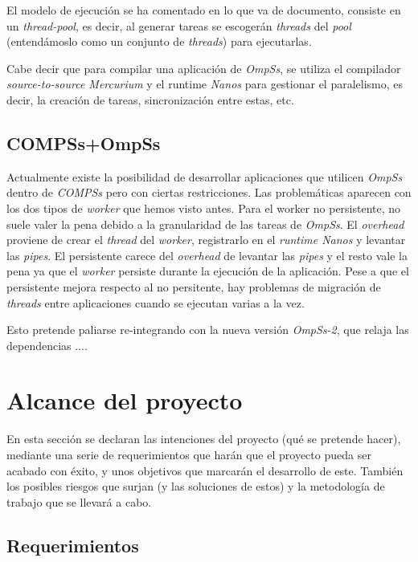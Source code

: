 \documentclass[a4paper]{article}
\begin{document}
El modelo de ejecución se ha comentado en lo que va de documento, consiste en un \textit{thread-pool}, es decir, al generar tareas se escogerán \textit{threads} del \textit{pool} (entendámoslo como un conjunto de \textit{threads}) para ejecutarlas.
\par\bigskip

Cabe decir que para compilar una aplicación de \textit{OmpSs}, se utiliza el compilador \textit{source-to-source Mercurium} y el runtime \textit{Nanos} para gestionar el paralelismo, es decir, la creación de tareas, sincronización entre estas, etc.

\subsection{COMPSs+OmpSs} \label{compssompss}

Actualmente existe la posibilidad de desarrollar aplicaciones que utilicen \textit{OmpSs} dentro de \textit{COMPSs} pero con ciertas restricciones. Las problemáticas aparecen con los dos tipos de \textit{worker} que hemos visto antes. Para el worker no persistente, no suele valer la pena debido a la granularidad de las tareas de \textit{OmpSs}. El \textit{overhead} proviene de crear el \textit{thread} del \textit{worker}, registrarlo en el \textit{runtime Nanos} y levantar las \textit{pipes}. El persistente carece del \textit{overhead} de levantar las \textit{pipes} y el resto vale la pena ya que el \textit{worker} persiste durante la ejecución de la aplicación. Pese a que el persistente mejora respecto al no persitente, hay problemas de migración de \textit{threads} entre aplicaciones cuando se ejecutan varias a la vez.
\par\bigskip

Esto pretende paliarse re-integrando con la nueva versión \textit{OmpSs-2}, que relaja las dependencias ....

\section{Alcance del proyecto}

En esta sección se declaran las intenciones del proyecto (qué se pretende hacer), mediante una serie de requerimientos que harán que el proyecto pueda ser acabado con éxito, y unos objetivos que marcarán el desarrollo de este. También los posibles riesgos que surjan (y las soluciones de estos) y la metodología de trabajo que se llevará a cabo.

\subsection{Requerimientos}
\end{document}
